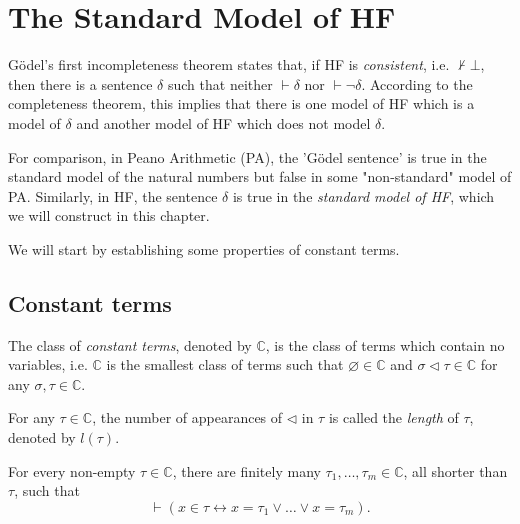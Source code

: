 \chapter{The Standard Model of HF}

Gödel's first incompleteness theorem states that, if HF is \textit{consistent}, i.e.
$\not\vdash\bot$, then there is a sentence $\delta$ such that neither $\vdash \delta$ nor
$\vdash \neg\delta$. According to the completeness theorem, 
this implies that there is one model of HF which is
a model of $\delta$ and another model of HF which does not model $\delta$.

For comparison, in Peano Arithmetic (PA), the 'Gödel sentence' is true in the standard model of 
the natural numbers but false in some "non-standard" model of PA. 
Similarly, in HF, the sentence $\delta$ is true in the \textit{standard model of HF}, 
which we will construct in this chapter.

We will start by establishing some properties of constant terms.

\section{Constant terms}

\begin{definition}
    \label{def:C}
    The class of \textit{constant terms}, denoted by $\mathbb{C}$, is the class of terms which
    contain no variables, i.e. $\mathbb{C}$ is the smallest class of terms such that 
    $\varnothing \in \mathbb{C}$ and 
    $\sigma \lhd \tau \in \mathbb{C}$ for any $\sigma, \tau \in \mathbb{C}$.

    For any $\tau \in \mathbb{C}$, the number of appearances of $\lhd$ in $\tau$ is called the
    \textit{length} of $\tau$, denoted by $l(\tau)$.
\end{definition}

\begin{lemma}
    For every non-empty $\tau \in \mathbb{C}$, there are finitely many 
    $\tau_1, \ldots, \tau_m \in \mathbb{C}$, all shorter than $\tau$, such that
    $$
    \vdash (x \in \tau \leftrightarrow x = \tau_1 \lor \ldots \lor x = \tau_m).
    $$
\end{lemma}

